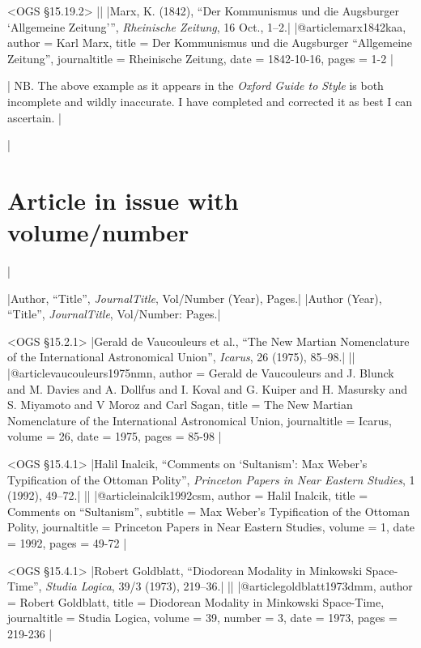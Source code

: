\documentclass[extrafontsizes,11pt,a4paper,oneside]{memoir}
\begin{document}
\bibexample<OGS \S15.19.2>
||%
|Marx, K. (1842), \enquote{Der Kommunismus und die Augsburger \enquote{Allgemeine Zeitung}}, \emph{Rheinische Zeitung}, 16 Oct., 1–2.|%
|@article{marx1842kaa,
  author = {Karl Marx},
  title = {Der Kommunismus und die Augsburger \enquote{Allgemeine Zeitung}},
  journaltitle = {Rheinische Zeitung},
  date = {1842-10-16},
  pages = {1-2}
}|

\todoc[oxyear]|
NB. The above example as it appears in the \emph{Oxford Guide to Style} is both incomplete and wildly inaccurate.
I have completed and corrected it as best I can ascertain.
|

\todoc|
\section{Article in issue with volume/number}
|

\specs
|Author, \enquote{Title}, \emph{JournalTitle}, Vol/Number (Year), Pages.|%
|Author (Year), \enquote{Title}, \emph{JournalTitle}, Vol/Number: Pages.|

\bibexample<OGS \S15.2.1>
|Gerald de Vaucouleurs et al., \enquote{The New Martian Nomenclature of the International Astronomical Union}, \emph{Icarus}, 26 (1975), 85--98.|%
||%
|@article{vaucouleurs1975nmn,
  author = {Gerald de Vaucouleurs and J. Blunck and M. Davies and A. Dollfus and I. Koval and G. Kuiper and H. Masursky and S. Miyamoto and V Moroz and Carl Sagan},
  title = {The New {Martian} Nomenclature of the {International} {Astronomical} {Union}},
  journaltitle = {Icarus},
  volume = {26},
  date = {1975},
  pages = {85-98}
}|

\bibexample<OGS \S15.4.1>
|Halil Inalcik, \enquote{Comments on \enquote{Sultanism}: Max Weber's Typification of the Ottoman Polity}, \emph{Princeton Papers in Near Eastern Studies}, 1 (1992), 49--72.|%
||%
|@article{inalcik1992csm,
  author = {Halil Inalcik},
  title = {Comments on \enquote{Sultanism}},
  subtitle = {Max Weber's Typification of the Ottoman Polity},
  journaltitle = {Princeton Papers in Near Eastern Studies},
  volume = {1},
  date = {1992},
  pages = {49-72}
}|

\bibexample<OGS \S15.4.1>
|Robert Goldblatt, \enquote{Diodorean Modality in Minkowski Space-Time}, \emph{Studia Logica}, 39/3 (1973), 219--36.|%
||%
|@article{goldblatt1973dmm,
  author = {Robert Goldblatt},
  title = {Diodorean Modality in Minkowski Space-Time},
  journaltitle = {Studia Logica},
  volume = {39},
  number = {3},
  date = {1973},
  pages = {219-236}
}|
\end{document}

